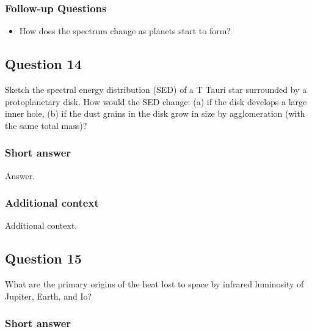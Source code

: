 \documentclass[a4paper,10pt]{article}
\begin{document}
\subsubsection{Follow-up Questions}

\begin{itemize}
    \item How does the spectrum change as planets start to form?
\end{itemize}


\newpage
\subsection{Question 14}

Sketch the spectral energy distribution (SED) of a T Tauri star surrounded by a protoplanetary disk. How would the SED change: (a) if the disk develops a large inner hole, (b) if the dust grains in the disk grow in size by agglomeration (with the same total mass)?

\subsubsection{Short answer}

Answer.

\subsubsection{Additional context}

Additional context.


\newpage
\subsection{Question 15}

What are the primary origins of the heat lost to space by infrared luminosity of Jupiter, Earth, and Io?

\subsubsection{Short answer}
\end{document}
